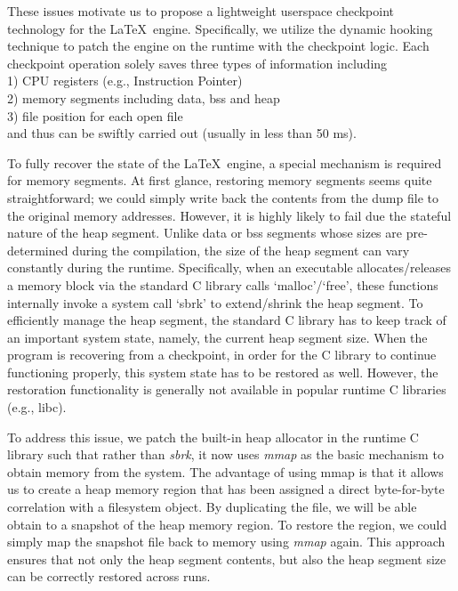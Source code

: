 \documentclass[]{sigchi}
\begin{document}
These issues motivate us to propose a lightweight userspace checkpoint technology for the \LaTeX\ engine. Specifically, we utilize the dynamic hooking technique \cite{hooking} to patch the engine on the runtime with the checkpoint logic. Each checkpoint operation solely saves three types of information including \\	
1) CPU registers (e.g., Instruction Pointer) \\
2) memory segments including data, bss and heap \\
3) file position for each open file \\
and thus can be swiftly carried out (usually in less than 50 ms).

To fully recover the state of the \LaTeX\ engine, a special mechanism is required for memory segments. At first glance, restoring memory segments seems quite straightforward; we could simply write back the contents from the dump file to the original memory addresses. However, it is highly likely to fail due the stateful nature of the heap segment. Unlike data or bss segments whose sizes are pre-determined during the compilation, the size of the heap segment can vary constantly during the runtime. Specifically, when an executable allocates/releases a memory block via the standard C library calls `malloc'/`free', these functions internally invoke a system call `sbrk' to extend/shrink the heap segment. To efficiently manage the heap segment, the standard C library has to keep track of an important system state, namely, the current heap segment size. When the program is recovering from a checkpoint, in order for the C library to continue functioning properly, this system state has to be restored as well. However, the restoration functionality is generally not available in popular runtime C libraries (e.g., libc). 



To address this issue, we patch the built-in heap allocator in the runtime C library such that rather than \textit{sbrk}, it now uses \textit{mmap} as the basic mechanism to obtain memory from the system. The advantage of using mmap is that it allows us to create a heap memory region that has been assigned a direct byte-for-byte correlation with a filesystem object. By duplicating the file, we will be able obtain to a snapshot of the heap memory region. To restore the region, we could simply map the snapshot file back to memory using \textit{mmap} again. This approach ensures that not only the heap segment contents, but also the heap segment size can be correctly restored across runs. 
\end{document}
